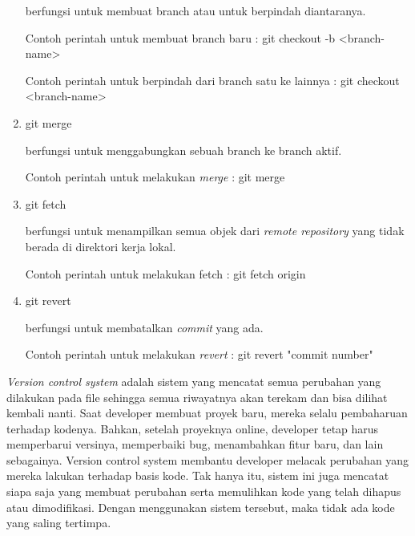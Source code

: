 \begin{enumerate}
    berfungsi untuk membuat branch atau untuk berpindah diantaranya.
    
    Contoh perintah untuk membuat branch baru : git checkout -b <branch-name>
    
    Contoh perintah untuk berpindah dari branch satu ke lainnya : git checkout <branch-name>
    \item git merge
    
    berfungsi untuk menggabungkan sebuah branch ke branch aktif.
    
    Contoh perintah untuk melakukan \textit{merge} : git merge
    \item git fetch
    
    berfungsi untuk menampilkan semua objek dari \textit{remote repository} yang tidak berada di direktori kerja lokal.
    
    Contoh perintah untuk melakukan fetch : git fetch origin
    \item git revert
    
    berfungsi untuk membatalkan \textit{commit} yang ada.
    
    Contoh perintah untuk melakukan \textit{revert} : git revert "commit number"
\end{enumerate}
\textit{Version control system} adalah sistem yang mencatat semua perubahan yang dilakukan pada file sehingga semua riwayatnya akan terekam dan bisa dilihat kembali nanti. Saat developer membuat proyek baru, mereka selalu pembaharuan terhadap kodenya. Bahkan, setelah proyeknya online, developer tetap harus memperbarui versinya, memperbaiki bug, menambahkan fitur baru, dan lain sebagainya. Version control system membantu developer melacak perubahan yang mereka lakukan terhadap basis kode. Tak hanya itu, sistem ini juga mencatat siapa saja yang membuat perubahan serta memulihkan kode yang telah dihapus atau dimodifikasi. Dengan menggunakan sistem tersebut, maka tidak ada kode yang saling tertimpa. 






